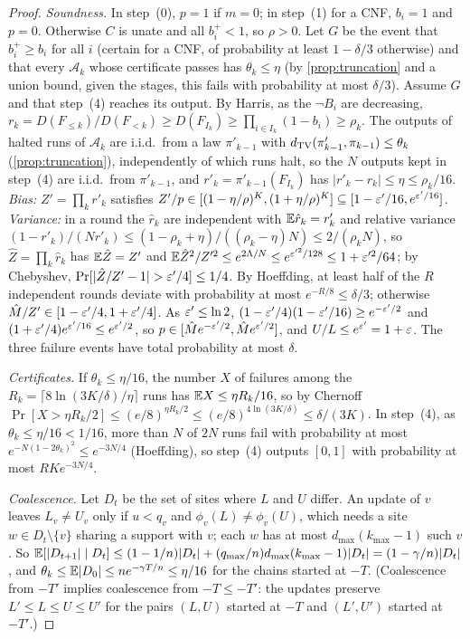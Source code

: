 \begin{proof}
\emph{Soundness.} In step~(0), $p=1$ if $m=0$; in step~(1) for a CNF, $b_i=1$ and
$p=0$. Otherwise $C$ is unate and all $b_i^+<1$, so $\rho>0$. Let $G$ be the event that
$b_i^+\ge b_i$ for all $i$ (certain for a CNF, of probability at least $1-\delta/3$
otherwise) and that every $\mathcal A_k$ whose certificate passes has
$\theta_k\le\eta$ (by \cref{prop:truncation} and a union bound, given the stages, this
fails with probability at most $\delta/3$). Assume $G$ and that step~(4) reaches its
output. By Harris, as the $\neg B_i$ are decreasing,
$r_k=D(F_{\le k})/D(F_{<k})\ge D(F_{I_k})\ge\prod_{i\in I_k}(1-b_i)\ge\rho_k$. The
outputs of halted runs of $\mathcal A_k$ are i.i.d.\ from a law $\pi'_{k-1}$ with
$d_{\rm TV}(\pi'_{k-1},\pi_{k-1})\le\theta_k$ (\cref{prop:truncation}), independently
of which runs halt, so the $N$ outputs kept in step~(4) are i.i.d.\ from
$\pi'_{k-1}$, and $r'_k=\pi'_{k-1}(F_{I_k})$ has $|r'_k-r_k|\le\eta\le\rho_k/16$.
\emph{Bias:} $Z'=\prod_kr'_k$ satisfies $Z'/p\in[(1-\eta/\rho)^K,(1+\eta/\rho)^K]
\subseteq[1-\varepsilon'/16,e^{\varepsilon'/16}]$. \emph{Variance:} in a round the $\hat r_k$ are
independent with $\mathbb{E}\hat r_k=r'_k$ and relative variance
$(1-r'_k)/(Nr'_k)\le(1-\rho_k+\eta)/((\rho_k-\eta)N)\le2/(\rho_kN)$, so
$\hat Z=\prod_k\hat r_k$ has $\mathbb{E}\hat Z=Z'$ and
$\mathbb{E}\hat Z^2/Z'^2\le e^{2\Lambda/N}\le e^{\varepsilon'^2/128}\le1+\varepsilon'^2/64$; by Chebyshev,
$\Pr[|\hat Z/Z'-1|>\eps'/4]\le1/4$. By Hoeffding, at least half of the $R$
independent rounds deviate with probability at most $e^{-R/8}\le\delta/3$; otherwise
$\hat M/Z'\in[1-\varepsilon'/4,1+\varepsilon'/4]$. As $\varepsilon'\le\ln2$,
$(1-\varepsilon'/4)(1-\varepsilon'/16)\ge e^{-\varepsilon'/2}$ and $(1+\varepsilon'/4)e^{\varepsilon'/16}\le e^{\varepsilon'/2}$,
so $p\in[\hat Me^{-\varepsilon'/2},\hat Me^{\varepsilon'/2}]$, and $U/L\le e^{\varepsilon'}=1+\varepsilon$. The three
failure events have total probability at most $\delta$.

\emph{Certificates.} If $\theta_k\le\eta/16$, the number $X$ of failures among the
$R_k=\lceil8\ln(3K/\delta)/\eta\rceil$ runs has $\mathbb{E} X\le\eta R_k/16$, so by Chernoff
$\Pr[X>\eta R_k/2]\le(e/8)^{\eta R_k/2}\le(e/8)^{4\ln(3K/\delta)}\le\delta/(3K)$.
In step~(4), as $\theta_k\le\eta/16<1/16$, more than $N$ of $2N$ runs fail with
probability at most $e^{-N(1-2\theta_k)^2}\le e^{-3N/4}$ (Hoeffding), so step~(4)
outputs $[0,1]$ with probability at most $RKe^{-3N/4}$.

\emph{Coalescence.} Let $D_t$ be the set of sites where $L$ and $U$ differ. An update
of $v$ leaves $L_v\ne U_v$ only if $u<q_v$ and $\phi_v(L)\ne\phi_v(U)$, which needs a
site $w\in D_t\setminus\{v\}$ sharing a support with $v$; each $w$ has at most
$d_{\max}(k_{\max}-1)$ such $v$. So
$\mathbb{E}[|D_{t+1}|\mid D_t]\le(1-1/n)|D_t|+(q_{\max}/n)d_{\max}(k_{\max}-1)|D_t|=(1-\gamma/n)|D_t|$,
and $\theta_k\le\mathbb{E}|D_0|\le ne^{-\gamma T/n}\le\eta/16$ for the chains started at
$-T$. (Coalescence from $-T'$ implies coalescence from $-T\le-T'$: the updates
preserve $L'\le L\le U\le U'$ for the pairs $(L,U)$ started at $-T$ and $(L',U')$
started at $-T'$.)


\end{proof}
